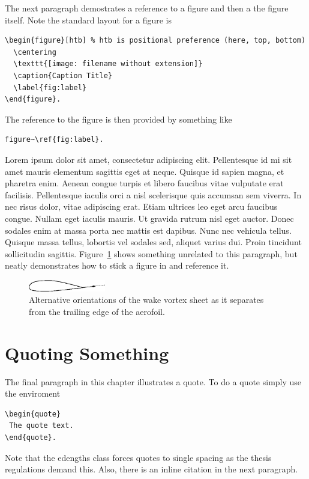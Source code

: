 The next paragraph demostrates a reference to a figure and then a the figure
itself. Note the standard layout for a figure is
\begin{verbatim}
\begin{figure}[htb] % htb is positional preference (here, top, bottom)
  \centering
  \texttt{[image: filename without extension]}
  \caption{Caption Title}
  \label{fig:label}
\end{figure}.
\end{verbatim}
The reference to the figure is then provided by something like
\begin{verbatim}
figure~\ref{fig:label}.
\end{verbatim}

Lorem ipsum dolor sit amet, consectetur adipiscing elit. Pellentesque id mi sit
amet mauris elementum sagittis eget at neque. Quisque id sapien magna, et
pharetra enim. Aenean congue turpis et libero faucibus vitae vulputate erat
facilisis. Pellentesque iaculis orci a nisl scelerisque quis accumsan sem
viverra. In nec risus dolor, vitae adipiscing erat. Etiam ultrices leo eget arcu
faucibus congue. Nullam eget iaculis mauris. Ut gravida rutrum nisl eget auctor.
Donec sodales enim at massa porta nec mattis est dapibus. Nunc nec vehicula
tellus. Quisque massa tellus, lobortis vel sodales sed, aliquet varius dui.
Proin tincidunt sollicitudin sagittis. Figure~\ref{fig:bottomkutta} shows
something unrelated to this paragraph, but neatly demonstrates how to stick a
figure in and reference it.

\begin{figure}[htb]
  \centering
  \includegraphics[width=0.3\textwidth]{bottomkutta}
  \caption{Alternative orientations of the wake vortex sheet as it separates
  from the trailing edge of the aerofoil.}
  \label{fig:bottomkutta}
\end{figure}

\section{Quoting Something}

The final paragraph in this chapter illustrates a quote. To do a quote
simply use the enviroment
\begin{verbatim}
\begin{quote}
 The quote text.
\end{quote}.
\end{verbatim}
Note that the edengths class forces quotes to single spacing as the thesis
regulations demand this. Also, there is an inline citation in the next
paragraph.

